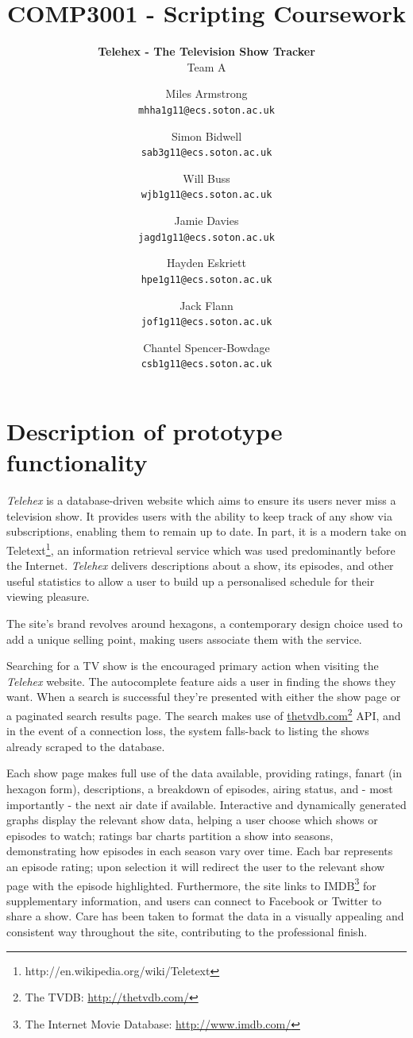 \documentclass[12pt, a4paper]{article}
\title{\Huge COMP3001 - Scripting Coursework}
\subtitle{\textbf{Telehex - The Television Show Tracker}\\[2em] \Large Team A}
\author{
  Miles Armstrong\\
  \texttt{mhha1g11@ecs.soton.ac.uk}
  \and 
  Simon Bidwell\\
  \texttt{sab3g11@ecs.soton.ac.uk}
  \and 
  Will Buss\\
  \texttt{wjb1g11@ecs.soton.ac.uk}
  \and  
  Jamie Davies\\
  \texttt{jagd1g11@ecs.soton.ac.uk}
  \and  
  Hayden Eskriett\\
  \texttt{hpe1g11@ecs.soton.ac.uk}
  \and
  Jack Flann\\
  \texttt{jof1g11@ecs.soton.ac.uk}
  \and
  Chantel Spencer-Bowdage\\
  \texttt{csb1g11@ecs.soton.ac.uk}\\[2em]
}
\begin{document}
{\color{white}
\clearpage\maketitle
\thispagestyle{empty}
}
\newpage
\section{Description of prototype functionality}

\textit{Telehex} is a database-driven website which aims to ensure its users never miss a television show. It provides users with the ability to keep track of any show via subscriptions, enabling them to remain up to date. In part, it is a modern take on Teletext\footnote{http://en.wikipedia.org/wiki/Teletext}, an information retrieval service which was used predominantly before the Internet. \textit{Telehex} delivers descriptions about a show, its episodes, and other useful statistics to allow a user to build up a personalised schedule for their viewing pleasure. 

The site's brand revolves around hexagons, a contemporary design choice used to add a unique selling point, making users associate them with the service.  

Searching for a TV show is the encouraged primary action when visiting the \textit{Telehex} website. The autocomplete feature aids a user in finding the shows they want. When a search is successful they're presented with either the show page or a paginated search results page. The search makes use of \href{http://thetvdb.com/}{thetvdb.com}\footnote{The TVDB: \href{http://thetvdb.com/}{http://thetvdb.com/}} API, and in the event of a connection loss, the system falls-back to listing the shows already scraped to the database.

Each show page makes full use of the data available, providing ratings, fanart (in hexagon form), descriptions, a breakdown of episodes, airing status, and - most importantly - the next air date if available. Interactive and dynamically generated graphs display the relevant show data, helping a user choose which shows or episodes to watch; ratings bar charts partition a show into seasons, demonstrating how episodes in each season vary over time. Each bar represents an episode rating; upon selection it will redirect the user to the relevant show page with the episode highlighted. Furthermore, the site links to IMDB\footnote{The Internet Movie Database: \href{http://www.imdb.com/}{http://www.imdb.com/}} for supplementary information, and users can connect to Facebook or Twitter to share a show. Care has been taken to format the data in a visually appealing and consistent way throughout the site, contributing to the professional finish. 
\end{document}

